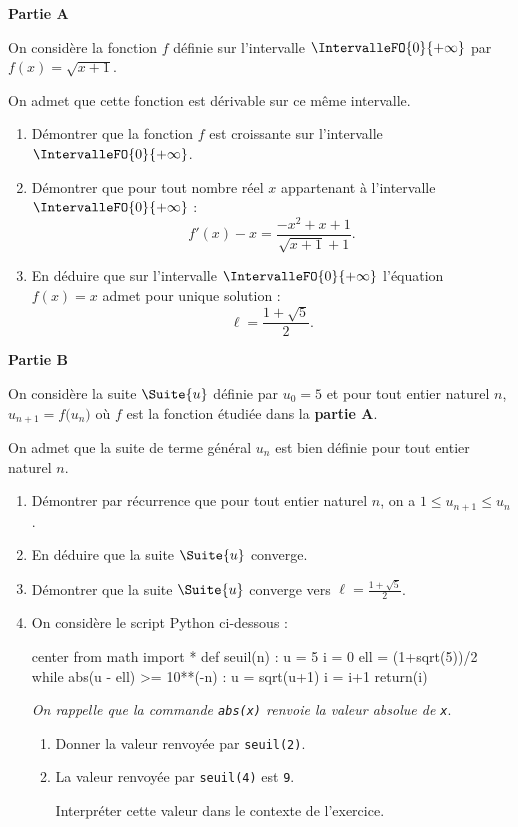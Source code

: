\textbf{Partie A}

\medskip

On considère la fonction $f$ définie sur l’intervalle $\IntervalleFO{0}{+\infty}$ par $f(x)=\sqrt{x+1}$.

On admet que cette fonction est dérivable sur ce même intervalle.

\begin{enumerate}
	\item Démontrer que la fonction $f$ est croissante sur l’intervalle $\IntervalleFO{0}{+\infty}$.
	\item Démontrer que pour tout nombre réel $x$ appartenant à l’intervalle $\IntervalleFO{0}{+\infty}$ : \[ f'(x)-x=\frac{-x^2+x+1}{\sqrt{x+1}+1}. \]
	\item En déduire que sur l’intervalle $\IntervalleFO{0}{+\infty}$ l’équation $f(x)=x$ admet pour unique solution : \[ \ell = \frac{1+\sqrt{5}}{2}. \]
\end{enumerate}

\smallskip

\textbf{Partie B}

\medskip

On considère la suite $\Suite{u}$ définie par $u_0 = 5$ et pour tout entier naturel $n$, $u_{n+1} = f\big(u_n\big)$ où $f$ est la fonction étudiée dans la \textbf{partie A}.

On admet que la suite de terme général $u_n$ est bien définie pour tout entier naturel $n$.

\begin{enumerate}
	\item Démontrer par récurrence que pour tout entier naturel $n$, on a $1 \leqslant u_{n+1} \leqslant u_n$.
	\item En déduire que la suite $\Suite{u}$ converge.
	\item Démontrer que la suite $\Suite{u}$ converge vers $\ell = \frac{1+\sqrt{5}}{2}$.
	\item On considère le script \textsf{Python} ci-dessous :

\begin{CodePythonLstAlt}[Largeur=0.6\linewidth]{center}
from math import *
def seuil(n) :
	u = 5
	i = 0
	ell = (1+sqrt(5))/2
	while abs(u - ell) >= 10**(-n) :
		u = sqrt(u+1)
		i = i+1
	return(i)
\end{CodePythonLstAlt}
	\emph{On rappelle que la commande \textup{\texttt{abs(x)}} renvoie la valeur absolue de \textup{\texttt{x}}}.
	\begin{enumerate}
		\item Donner la valeur renvoyée par \texttt{seuil(2)}.
		\item La valeur renvoyée par \texttt{seuil(4)} est \texttt{9}.
		
		Interpréter cette valeur dans le contexte de l’exercice.
	\end{enumerate}
\end{enumerate}